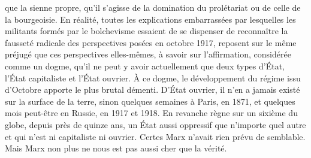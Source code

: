\documentclass[french,twoside]{book} %
\begin{document}
que la sienne propre, qu'il s'agisse de la domination du prolétariat ou de celle de la bourgeoisie. En réalité, toutes les explications embarrassées par lesquelles les militants formés par le bolchevisme essaient de se dispenser de reconnaître la fausseté radicale des perspectives posées en octobre 1917, reposent sur le même préjugé que ces perspectives elles-mêmes, à savoir sur l'affirmation, considérée comme un dogme, qu'il ne peut y avoir actuellement que deux types d'État, l'État capitaliste et l'État ouvrier. À ce dogme, le développement du régime issu d'Octobre apporte le plus brutal démenti. D'État ouvrier, il n'en a jamais existé sur la surface de la terre, sinon quelques semaines à Paris, en 1871, et quelques mois peut-être en Russie, en 1917 et 1918. En revanche règne sur un sixième du globe, depuis près de quinze ans, un État aussi oppressif que n'importe quel autre et qui n'est ni capitaliste ni ouvrier. Certes Marx n'avait rien prévu de semblable. Mais Marx non plus ne nous est pas aussi cher que la vérité.\par
\end{document}
